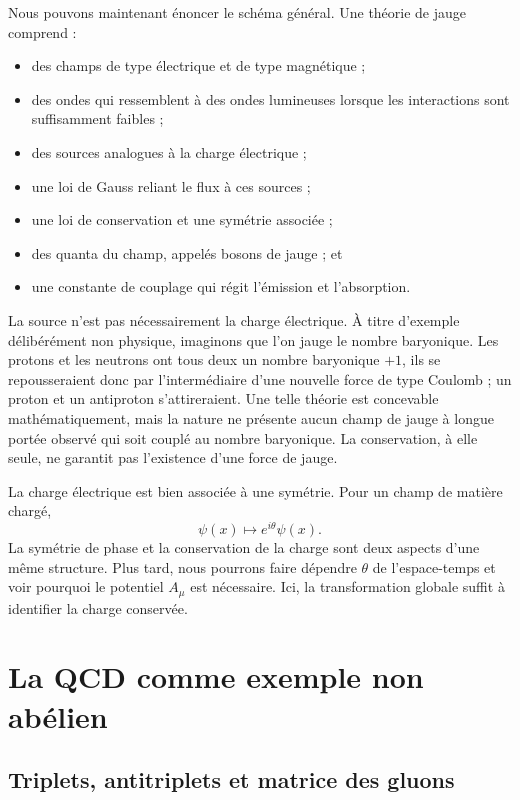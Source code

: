Nous pouvons maintenant énoncer le schéma général. Une théorie de jauge comprend :
\begin{itemize}
\item des champs de type électrique et de type magnétique ;
\item des ondes qui ressemblent à des ondes lumineuses lorsque les interactions sont suffisamment faibles ;
\item des sources analogues à la charge électrique ;
\item une loi de Gauss reliant le flux à ces sources ;
\item une loi de conservation et une symétrie associée ;
\item des quanta du champ, appelés bosons de jauge ; et
\item une constante de couplage qui régit l’émission et l’absorption.
\end{itemize}
La source n’est pas nécessairement la charge électrique. À titre d’exemple délibérément non physique, imaginons que l’on jauge le nombre baryonique. Les protons et les neutrons ont tous deux un nombre baryonique \(+1\), ils se repousseraient donc par l’intermédiaire d’une nouvelle force de type Coulomb ; un proton et un antiproton s’attireraient. Une telle théorie est concevable mathématiquement, mais la nature ne présente aucun champ de jauge à longue portée observé qui soit couplé au nombre baryonique. La conservation, à elle seule, ne garantit pas l’existence d’une force de jauge.

La charge électrique est bien associée à une symétrie. Pour un champ de matière chargé,
\begin{equation}
\psi(x)\longmapsto e^{i\theta}\psi(x).
\label{eq:l5-u1}
\end{equation}
La symétrie de phase et la conservation de la charge sont deux aspects d’une même structure. Plus tard, nous pourrons faire dépendre \(\theta\) de l’espace-temps et voir pourquoi le potentiel \(A_\mu\) est nécessaire. Ici, la transformation globale suffit à identifier la charge conservée.

\section{La QCD comme exemple non abélien}

\subsection{Triplets, antitriplets et matrice des gluons}

